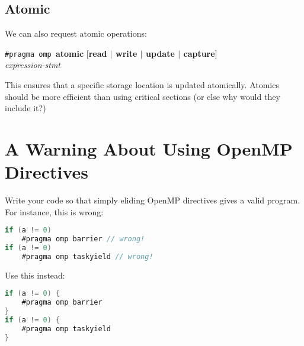 \subsection*{Atomic}
We can also request atomic operations:

    {\tt \#pragma omp }{\bf atomic} [{\bf read $\mid$ write $\mid$ update $\mid$ capture}]\\
    {\it expression-stmt}
    
This ensures that a specific storage location is updated
    atomically.  Atomics should be more efficient than using critical
    sections (or else why would they include it?)

\section*{A Warning About Using OpenMP Directives}
  Write your code so that simply eliding OpenMP directives gives a valid program. For instance, this is wrong:
  \begin{lstlisting}[language=C,morekeywords={foreach,pragma,omp,parallel,single,nowait,task,untied,barrier,taskyield}]
if (a != 0)
    #pragma omp barrier // wrong!
if (a != 0)
    #pragma omp taskyield // wrong!
  \end{lstlisting}

  Use this instead:
  \begin{lstlisting}[language=C,morekeywords={foreach,pragma,omp,parallel,single,nowait,task,untied,barrier,taskyield}]
if (a != 0) {
    #pragma omp barrier
}
if (a != 0) {
    #pragma omp taskyield
}
  \end{lstlisting}






